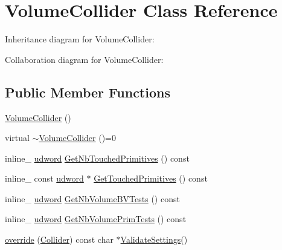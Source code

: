 \hypertarget{class_volume_collider}{\section{Volume\+Collider Class Reference}
\label{class_volume_collider}
}


Inheritance diagram for Volume\+Collider\+:


Collaboration diagram for Volume\+Collider\+:
\subsection*{Public Member Functions}
\begin{DoxyCompactItemize}
\item 
\hyperlink{class_volume_collider_a47d5798a198bc5a46bf03b27dbd6f58d}{Volume\+Collider} ()
\item 
virtual \hyperlink{class_volume_collider_a65b12ef17cd49013615330a4a1510beb}{$\sim$\+Volume\+Collider} ()=0
\item 
inline\+\_\+ \hyperlink{_ice_types_8h_a44c6f1920ba5551225fb534f9d1a1733}{udword} \hyperlink{class_volume_collider_a274b51032b2c2e4394b1cc9308fa8d71}{Get\+Nb\+Touched\+Primitives} () const 
\item 
inline\+\_\+ const \hyperlink{_ice_types_8h_a44c6f1920ba5551225fb534f9d1a1733}{udword} $\ast$ \hyperlink{class_volume_collider_afca0d34cb9f4aa27537a4bfd03fe40d9}{Get\+Touched\+Primitives} () const 
\item 
inline\+\_\+ \hyperlink{_ice_types_8h_a44c6f1920ba5551225fb534f9d1a1733}{udword} \hyperlink{class_volume_collider_a682b0bcfb8d5fbb96591909b6bae6276}{Get\+Nb\+Volume\+B\+V\+Tests} () const 
\item 
inline\+\_\+ \hyperlink{_ice_types_8h_a44c6f1920ba5551225fb534f9d1a1733}{udword} \hyperlink{class_volume_collider_a752c69151ed1070abbb6fb68b5f4376a}{Get\+Nb\+Volume\+Prim\+Tests} () const 
\item 
\hyperlink{class_volume_collider_a785ddb7e78cd48ff30179703f5c7285a}{override} (\hyperlink{class_collider}{Collider}) const char $\ast$\hyperlink{class_collider_a225d4861b2184336433894174c6e3e2d}{Validate\+Settings}()
\end{DoxyCompactItemize}
